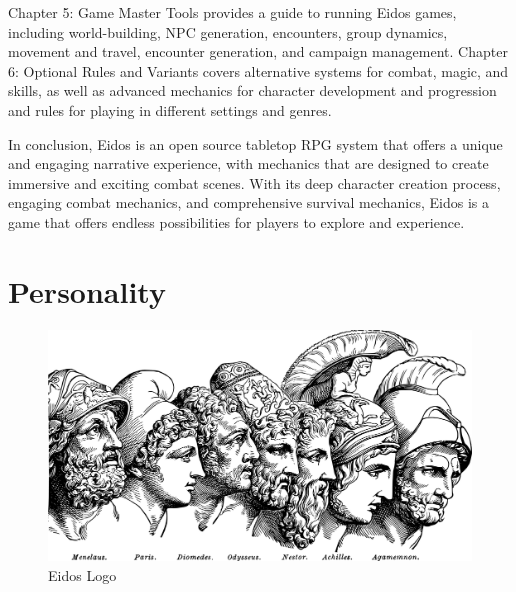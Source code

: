\documentclass[twocolumn,12pt]{article}  %
\begin{document}
Chapter 5: Game Master Tools provides a guide to running Eidos games, including world-building, NPC generation, encounters, group dynamics, movement and travel, encounter generation, and campaign management. Chapter 6: Optional Rules and Variants covers alternative systems for combat, magic, and skills, as well as advanced mechanics for character development and progression and rules for playing in different settings and genres.

In conclusion, Eidos is an open source tabletop RPG system that offers a unique and engaging narrative experience, with mechanics that are designed to create immersive and exciting combat scenes. With its deep character creation process, engaging combat mechanics, and comprehensive survival mechanics, Eidos is a game that offers endless possibilities for players to explore and experience.

\section*{Personality}

\begin{figure}[H]  %
    \centering
    \includegraphics[width=\linewidth]{./images/personality01.pdf}
    \caption{Eidos Logo}
\end{figure}
\end{document}
